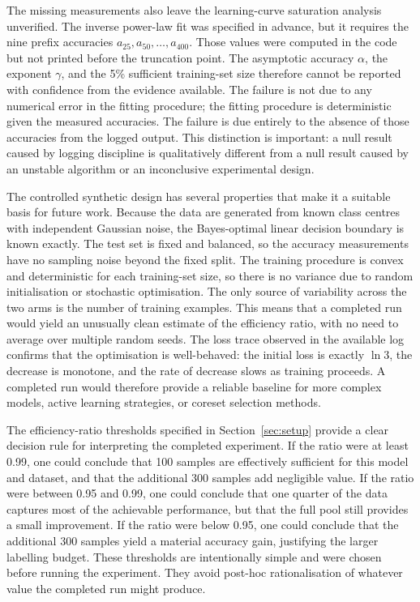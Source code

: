 \documentclass{article}
\begin{document}
The missing measurements also leave the learning-curve saturation analysis unverified. The inverse power-law fit was specified in advance, but it requires the nine prefix accuracies \(a_{25}, a_{50}, \ldots, a_{400}\). Those values were computed in the code but not printed before the truncation point. The asymptotic accuracy \(\alpha\), the exponent \(\gamma\), and the 5\% sufficient training-set size therefore cannot be reported with confidence from the evidence available. The failure is not due to any numerical error in the fitting procedure; the fitting procedure is deterministic given the measured accuracies. The failure is due entirely to the absence of those accuracies from the logged output. This distinction is important: a null result caused by logging discipline is qualitatively different from a null result caused by an unstable algorithm or an inconclusive experimental design.

The controlled synthetic design has several properties that make it a suitable basis for future work. Because the data are generated from known class centres with independent Gaussian noise, the Bayes-optimal linear decision boundary is known exactly. The test set is fixed and balanced, so the accuracy measurements have no sampling noise beyond the fixed split. The training procedure is convex and deterministic for each training-set size, so there is no variance due to random initialisation or stochastic optimisation. The only source of variability across the two arms is the number of training examples. This means that a completed run would yield an unusually clean estimate of the efficiency ratio, with no need to average over multiple random seeds. The loss trace observed in the available log confirms that the optimisation is well-behaved: the initial loss is exactly \(\ln 3\), the decrease is monotone, and the rate of decrease slows as training proceeds. A completed run would therefore provide a reliable baseline for more complex models, active learning strategies, or coreset selection methods.

The efficiency-ratio thresholds specified in Section~\ref{sec:setup} provide a clear decision rule for interpreting the completed experiment. If the ratio were at least 0.99, one could conclude that 100 samples are effectively sufficient for this model and dataset, and that the additional 300 samples add negligible value. If the ratio were between 0.95 and 0.99, one could conclude that one quarter of the data captures most of the achievable performance, but that the full pool still provides a small improvement. If the ratio were below 0.95, one could conclude that the additional 300 samples yield a material accuracy gain, justifying the larger labelling budget. These thresholds are intentionally simple and were chosen before running the experiment. They avoid post-hoc rationalisation of whatever value the completed run might produce.
\end{document}
